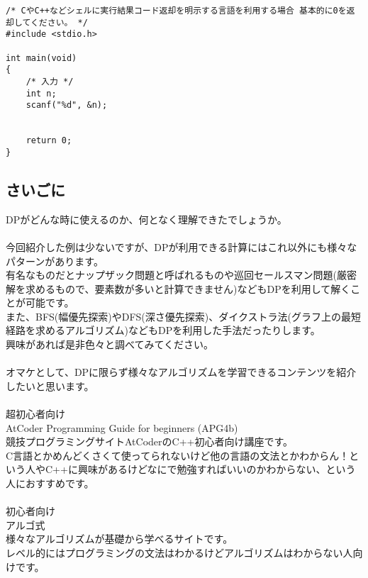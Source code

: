 \begin{lstlisting}[style = customC]
/* CやC++などシェルに実行結果コード返却を明示する言語を利用する場合 基本的に0を返却してください。 */
#include <stdio.h>

int main(void) 
{
    /* 入力 */
    int n;
    scanf("%d", &n);


    return 0; 
}
\end{lstlisting}

\clearpage

\subsection{さいごに}

\noindent
DPがどんな時に使えるのか、何となく理解できたでしょうか。
\\ \\ \noindent
今回紹介した例は少ないですが、DPが利用できる計算にはこれ以外にも様々なパターンがあります。\\
有名なものだとナップザック問題と呼ばれるものや巡回セールスマン問題(厳密解を求めるもので、要素数が多いと計算できません)などもDPを利用して解くことが可能です。\\
また、BFS(幅優先探索)やDFS(深さ優先探索)、ダイクストラ法(グラフ上の最短経路を求めるアルゴリズム)などもDPを利用した手法だったりします。\\
興味があれば是非色々と調べてみてください。
\\ \\ \noindent
オマケとして、DPに限らず様々なアルゴリズムを学習できるコンテンツを紹介したいと思います。
\\ \\ \noindent
{\Large 超初心者向け}\\
AtCoder Programming Guide for beginners (APG4b)\\
競技プログラミングサイトAtCoderのC++初心者向け講座です。\\
C言語とかめんどくさくて使ってられないけど他の言語の文法とかわからん！という人やC++に興味があるけどなにで勉強すればいいのかわからない、という人におすすめです。
\\ \\ \noindent
{\Large 初心者向け}\\
アルゴ式\\
様々なアルゴリズムが基礎から学べるサイトです。\\
レベル的にはプログラミングの文法はわかるけどアルゴリズムはわからない人向けです。
\\ \\ \noindent
